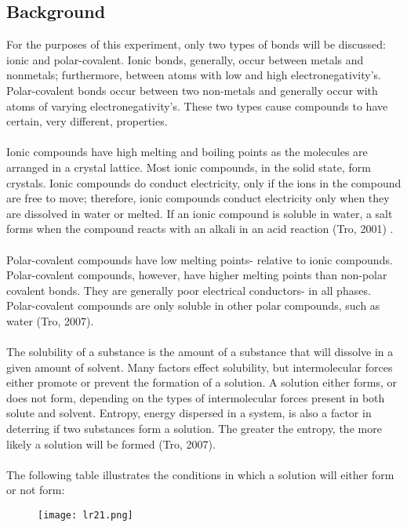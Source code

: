 \documentclass{article}
\begin{document}
\subsection*{Background} %
For the purposes of this experiment, only two types of bonds will be discussed: ionic and polar-covalent. Ionic bonds, generally, occur between metals and nonmetals; furthermore, between atoms with low and high electronegativity's. Polar-covalent bonds occur between two non-metals and generally occur with atoms of varying electronegativity's. These two types cause compounds to have certain, very different, properties. \\\\
Ionic compounds have high melting and boiling points as the molecules are arranged in a crystal lattice. Most ionic compounds, in the solid state, form crystals. Ionic compounds do conduct electricity, only if the ions in the compound are free to move; therefore, ionic compounds conduct electricity only when they are dissolved in water or melted. If an ionic compound is soluble in water, a salt forms when the compound reacts with an alkali in an acid reaction (Tro, 2001) . \\\\
Polar-covalent compounds have low melting points- relative to ionic compounds. Polar-covalent compounds, however, have higher melting points than non-polar covalent bonds. They are generally poor electrical conductors- in all phases. Polar-covalent compounds are only soluble in other polar compounds, such as water (Tro, 2007). \\\\
The solubility of a substance is the amount of a substance that will dissolve in a given amount of solvent. Many factors effect solubility, but intermolecular forces either promote or prevent the formation of a solution. A solution either forms, or does not form, depending on the types of intermolecular forces present in both solute and solvent. Entropy, energy dispersed in a system, is also a factor in deterring if two substances form a solution. The greater the entropy, the more likely a solution will be formed (Tro, 2007). \\\\
The following table illustrates the conditions in which a solution will either form or not form:\\
\begin{figure}[H]
	\centering
	\texttt{[image: lr21.png]} 
\end{figure} 
\end{document}
